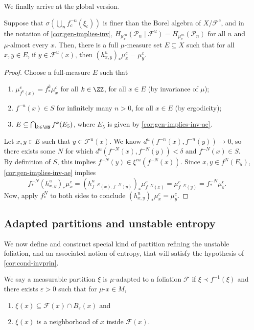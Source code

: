 \documentclass[../main]{subfiles}
\begin{document}
We finally arrive at the global version.

\begin{lemma}\label{cor:cond-invprin}
  Suppose that \(\sigma(\bigcup_n f_c^{-n}(\xi_c))\) is finer than the Borel algebra of \(X/\mathcal{F}^c\), and in the notation of \cref{cor:gen-implies-inv},  \(H_{\mu_x^{cu}}(\mathcal{P}_n\mid \mathcal{F}^u) = H_{\mu_x^{cu}}(\mathcal{P}_n)\) for all \(n\) and \(\mu\)-almost every \(x\). Then, there is a full \(\mu\)-measure set \(E \subseteq X\) such that for all \(x,y \in E\), if \(y \in \mathcal{F}^{u}(x)\), then \((h^u_{x,y})_*\mu^c_x = \mu^c_y\).
\end{lemma}

\begin{proof}
  Choose a full-measure \(E\) such that
  \begin{enumerate}
  \item \(\mu^c_{f^k(x)} = f^k_*\mu^c_x\) for all \(k \in \ZZ\), for all \(x \in E\) (by invariance of \(\mu\));
  \item \(f^{-n}(x) \in S\) for infinitely many \(n > 0\), for all \(x \in E\) (by ergodicity);
  \item \(E \subseteq \bigcap_{k \in \NN} f^{k}(E_5)\), where \(E_5\) is given by \cref{cor:gen-implies-inv-ae}.
  \end{enumerate}
  Let \(x,y \in E\) such that \(y \in \mathcal{F}^u(x)\). We know \(d^u(f^{-n}(x),f^{-n}(y)) \to 0\), so there exists some \(N\) for which \(d^u(f^{-N}(x),f^{-N}(y)) < \delta\) and \(f^{-N}(x) \in S\). By definition of \(S\), this implies \(f^{-N}(y) \in \xi^{cu}(f^{-N}(x))\). Since \(x, y \in f^N(E_5)\), \cref{cor:gen-implies-inv-ae} implies
  \[f^{-N}_*(h^u_{x,y})_*\mu^c_x = (h^u_{f^{-N}(x),f^{-N}(y)})_*\mu^c_{f^{-N}(x)} = \mu^c_{f^{-N}(y)} = f^{-N}_*\mu^c_y.\]
  Now, apply \(f^N_*\) to both sides to conclude \((h^u_{x,y})_*\mu^c_x = \mu^c_y\).
\end{proof}

\subsection{Adapted partitions and unstable entropy}

We now define and construct special kind of partition refining the unstable foliation, and an associated notion of entropy, that will satisfy the hypothesis of \cref{cor:cond-invprin}.

\begin{definition}
  We say a measurable partition \(\xi\) is \(\mu\)-adapted to a foliation \(\mathcal{F}\) if \(\xi \prec f^{-1}(\xi)\) and there exists \(\varepsilon > 0\) such that for \(\mu\)-\almostevery \(x \in M\),
  \begin{enumerate}
  \item\label{item:2} \(\xi(x) \subseteq \mathcal{F}(x)\cap B_{\varepsilon}(x)\) and
  \item\label{item:4} \(\xi(x)\) is a neighborhood of \(x\) inside \(\mathcal{F}(x)\).
  \end{enumerate}
\end{definition}
\end{document}
